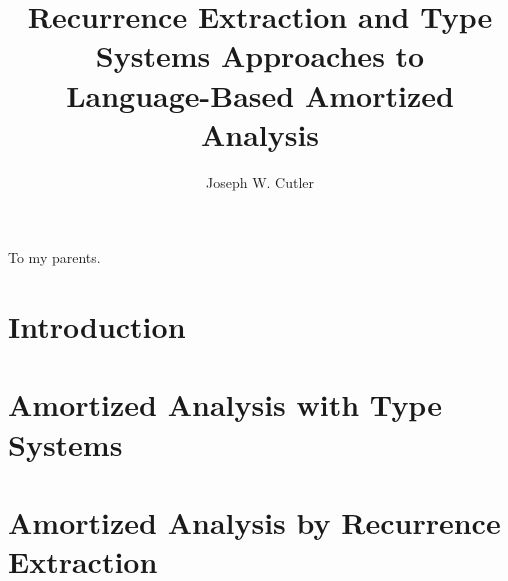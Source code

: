 \documentclass[draft]{westhesis}
\title{Recurrence Extraction and Type Systems Approaches to\\ Language-Based Amortized Analysis}
\author{Joseph W. Cutler}
\begin{document}
\begin{abstract}
\end{abstract}

\begin{dedication}
To my parents.
\end{dedication}

\begin{acknowledgements}
\end{acknowledgements}


\tableofcontents
\mainmatter


\chapter{Introduction}
%  

\chapter{Amortized Analysis with Type Systems}
\label{chap:lambda-amor}



\chapter{Amortized Analysis by Recurrence Extraction}
\label{chap:rec-extr}
%




\appendix
\renewcommand\chaptername{Appendix}

\chapter{}
\label{appendix:a}


\chapter{}
\label{appendix:b}
%
\end{document}
